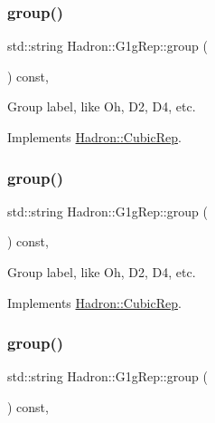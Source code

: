 \subsubsection{\texorpdfstring{group()}{group()}\hspace{0.1cm}{\footnotesize\ttfamily [1/3]}}
{\footnotesize\ttfamily std\+::string Hadron\+::\+G1g\+Rep\+::group (\begin{DoxyParamCaption}{ }\end{DoxyParamCaption}) const\hspace{0.3cm}{\ttfamily [inline]}, {\ttfamily [virtual]}}

Group label, like Oh, D2, D4, etc. 

Implements \mbox{\hyperlink{structHadron_1_1CubicRep_a0748f11ec87f387062c8e8981339a29c}{Hadron\+::\+Cubic\+Rep}}.

\mbox{\label{structHadron_1_1G1gRep_a9cac45eca83a4b934646e99a068bec72}} 
\subsubsection{\texorpdfstring{group()}{group()}\hspace{0.1cm}{\footnotesize\ttfamily [2/3]}}
{\footnotesize\ttfamily std\+::string Hadron\+::\+G1g\+Rep\+::group (\begin{DoxyParamCaption}{ }\end{DoxyParamCaption}) const\hspace{0.3cm}{\ttfamily [inline]}, {\ttfamily [virtual]}}

Group label, like Oh, D2, D4, etc. 

Implements \mbox{\hyperlink{structHadron_1_1CubicRep_a0748f11ec87f387062c8e8981339a29c}{Hadron\+::\+Cubic\+Rep}}.

\mbox{\label{structHadron_1_1G1gRep_a9cac45eca83a4b934646e99a068bec72}} 
\subsubsection{\texorpdfstring{group()}{group()}\hspace{0.1cm}{\footnotesize\ttfamily [3/3]}}
{\footnotesize\ttfamily std\+::string Hadron\+::\+G1g\+Rep\+::group (\begin{DoxyParamCaption}{ }\end{DoxyParamCaption}) const\hspace{0.3cm}{\ttfamily [inline]}, {\ttfamily [virtual]}}

